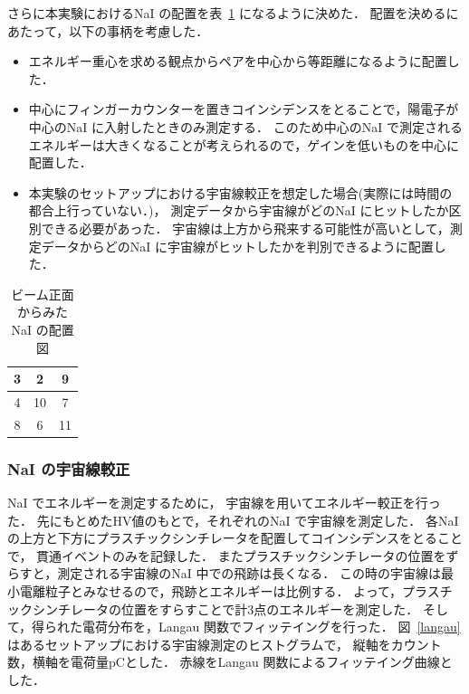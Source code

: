 さらに本実験におけるNaI の配置を表~\ref{haichi} になるように決めた．
配置を決めるにあたって，以下の事柄を考慮した．
\begin{itemize}
\item エネルギー重心を求める観点からペアを中心から等距離になるように配置した．
\item 中心にフィンガーカウンターを置きコインシデンスをとることで，陽電子が中心のNaI に入射したときのみ測定する．
  このため中心のNaI で測定されるエネルギーは大きくなることが考えられるので，ゲインを低いものを中心に配置した．
\item 本実験のセットアップにおける宇宙線較正を想定した場合(実際には時間の都合上行っていない．)，
  測定データから宇宙線がどのNaI にヒットしたか区別できる必要があった．
  宇宙線は上方から飛来する可能性が高いとして，測定データからどのNaI に宇宙線がヒットしたかを判別できるように配置した．
\end{itemize}
\begin{table}[H]
  \begin{center}
    \caption{ビーム正面からみたNaI の配置図}\label{haichi}
    \begin{tabular}{|c|c|c|}\hline 
      \cellcolor{yellow}3&\cellcolor{red}2&\cellcolor{yellow}9\\ \hline
      \cellcolor{cyan}4&10&\cellcolor{red}7\\ \hline
      \cellcolor{green}8&\cellcolor{cyan}6&\cellcolor{green}11\\ \hline
    \end{tabular}
  \end{center}
\end{table}
\newpage
\subsubsection{NaI の宇宙線較正}
NaI でエネルギーを測定するために， 宇宙線を用いてエネルギー較正を行った．
先にもとめたHV値のもとで，それぞれのNaI で宇宙線を測定した．
各NaI の上方と下方にプラスチックシンチレータを配置してコインシデンスをとることで，
貫通イベントのみを記録した．
またプラスチックシンチレータの位置をずらすと，測定される宇宙線のNaI 中での飛跡は長くなる．
この時の宇宙線は最小電離粒子とみなせるので，飛跡とエネルギーは比例する．
よって，プラスチックシンチレータの位置をすらすことで計3点のエネルギーを測定した．
そして，得られた電荷分布を，Langau 関数でフィッテイングを行った．
図~\ref{langau} はあるセットアップにおける宇宙線測定のヒストグラムで，
縦軸をカウント数，横軸を電荷量$\mathrm{pC} $とした．
赤線をLangau 関数によるフィッテイング曲線とした．

